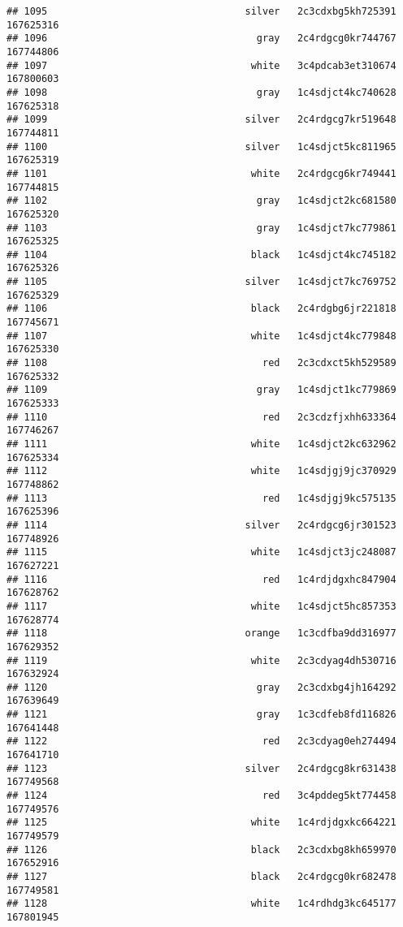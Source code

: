 \documentclass[
]{article}
\begin{document}
\begin{verbatim}
## 1095                                  silver   2c3cdxbg5kh725391 167625316
## 1096                                    gray   2c4rdgcg0kr744767 167744806
## 1097                                   white   3c4pdcab3et310674 167800603
## 1098                                    gray   1c4sdjct4kc740628 167625318
## 1099                                  silver   2c4rdgcg7kr519648 167744811
## 1100                                  silver   1c4sdjct5kc811965 167625319
## 1101                                   white   2c4rdgcg6kr749441 167744815
## 1102                                    gray   1c4sdjct2kc681580 167625320
## 1103                                    gray   1c4sdjct7kc779861 167625325
## 1104                                   black   1c4sdjct4kc745182 167625326
## 1105                                  silver   1c4sdjct7kc769752 167625329
## 1106                                   black   2c4rdgbg6jr221818 167745671
## 1107                                   white   1c4sdjct4kc779848 167625330
## 1108                                     red   2c3cdxct5kh529589 167625332
## 1109                                    gray   1c4sdjct1kc779869 167625333
## 1110                                     red   2c3cdzfjxhh633364 167746267
## 1111                                   white   1c4sdjct2kc632962 167625334
## 1112                                   white   1c4sdjgj9jc370929 167748862
## 1113                                     red   1c4sdjgj9kc575135 167625396
## 1114                                  silver   2c4rdgcg6jr301523 167748926
## 1115                                   white   1c4sdjct3jc248087 167627221
## 1116                                     red   1c4rdjdgxhc847904 167628762
## 1117                                   white   1c4sdjct5hc857353 167628774
## 1118                                  orange   1c3cdfba9dd316977 167629352
## 1119                                   white   2c3cdyag4dh530716 167632924
## 1120                                    gray   2c3cdxbg4jh164292 167639649
## 1121                                    gray   1c3cdfeb8fd116826 167641448
## 1122                                     red   2c3cdyag0eh274494 167641710
## 1123                                  silver   2c4rdgcg8kr631438 167749568
## 1124                                     red   3c4pddeg5kt774458 167749576
## 1125                                   white   1c4rdjdgxkc664221 167749579
## 1126                                   black   2c3cdxbg8kh659970 167652916
## 1127                                   black   2c4rdgcg0kr682478 167749581
## 1128                                   white   1c4rdhdg3kc645177 167801945

\end{verbatim}
\end{document}
